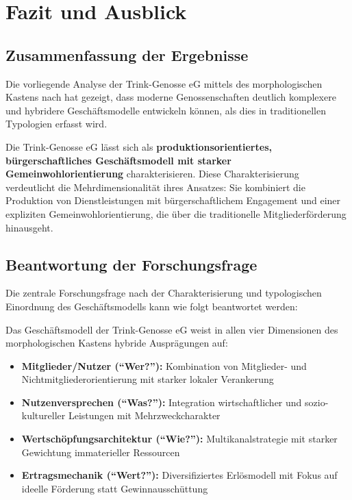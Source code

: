 \section{Fazit und Ausblick}

\subsection{Zusammenfassung der Ergebnisse}

Die vorliegende Analyse der Trink-Genosse eG mittels des morphologischen Kastens nach \textcite{blome-dreesGenossenschaftlicheGeschaeftsmodelleSemantik2023} hat gezeigt, dass moderne Genossenschaften deutlich komplexere und hybridere Geschäftsmodelle entwickeln können, als dies in traditionellen Typologien erfasst wird.

Die Trink-Genosse eG lässt sich als \textbf{produktionsorientiertes, bürgerschaftliches Geschäftsmodell mit starker Gemeinwohlorientierung} charakterisieren. Diese Charakterisierung verdeutlicht die Mehrdimensionalität ihres Ansatzes: Sie kombiniert die Produktion von Dienstleistungen mit bürgerschaftlichem Engagement und einer expliziten Gemeinwohlorientierung, die über die traditionelle Mitgliederförderung hinausgeht.

\subsection{Beantwortung der Forschungsfrage}

Die zentrale Forschungsfrage nach der Charakterisierung und typologischen Einordnung des Geschäftsmodells kann wie folgt beantwortet werden:

Das Geschäftsmodell der Trink-Genosse eG weist in allen vier Dimensionen des morphologischen Kastens hybride Ausprägungen auf:

\begin{itemize}
\item \textbf{Mitglieder/Nutzer (\enquote{Wer?}):} Kombination von Mitglieder- und Nichtmitgliederorientierung mit starker lokaler Verankerung
\item \textbf{Nutzenversprechen (\enquote{Was?}):} Integration wirtschaftlicher und sozio-kultureller Leistungen mit Mehrzweckcharakter
\item \textbf{Wertschöpfungsarchitektur (\enquote{Wie?}):} Multikanalstrategie mit starker Gewichtung immaterieller Ressourcen
\item \textbf{Ertragsmechanik (\enquote{Wert?}):} Diversifiziertes Erlösmodell mit Fokus auf ideelle Förderung statt Gewinnausschüttung
\end{itemize}

